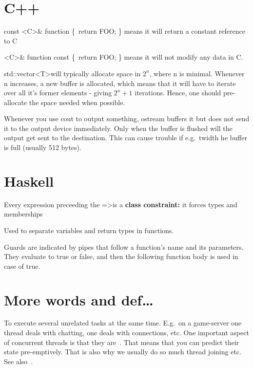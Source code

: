 \section{C++}

const \textless{C}\textgreater\& function \{\ return FOO; \}
means it will return a constant reference to C

\textless{C}\textgreater\& function const \{\ return FOO; \}
means it will not modify any data in C.


std::vector\textless{T}\textgreater will typically allocate space in $2^{n}$, where n is minimal.
Whenever n increases, a new buffer is allocated, which means that it will
have to iterate over all it's former elements - giving ${2^n+1}$ iterations.
Hence, one should pre-allocate the space needed when possible.

Whenever you use cout to output something, ostream buffers it but does not send
it to the output device immediately. Only when the buffer is flushed will the
output get sent to the destination. This can cause trouble if e.g.\
twidth he buffer is full (usually 512 bytes).

\section{Haskell}
\begin{definition}[=\textgreater]
    Every expression preceeding the =\textgreater is a 
    \textbf{class constraint:} it forces types and memberships

\end{definition}

\begin{definition}[-\textgreater]
    Used to separate variables and return types in functions.
\end{definition}

\begin{definition}[Guards]
    Guards are indicated by pipes that follow a function's name and its
    parameters. They evaluate to true or false, and then the following
    function body is used in case of true.

\end{definition}

\section{More words and def\dots}


\begin{definition}[Concurrency]\label{concurrency}
    To execute several unrelated tasks at the same time. E.g.\ on a game-server
    one thread deals with chatting, one deals with connections, etc.
    One important aspect of concurrent threads is that they
    are~. That means that you can predict their
    state pre-emptively. That is also why we usually do so much thread joining
    etc.
    See also~.

\end{definition}

